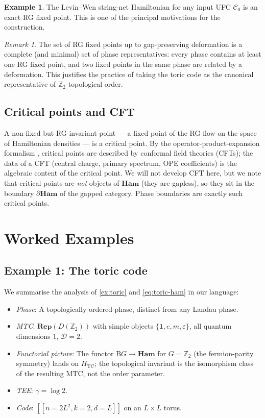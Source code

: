 \documentclass[12pt]{article}
\theoremstyle{plain}
\theoremstyle{definition}
\newtheorem{example}[theorem]{Example}
\theoremstyle{remark}
\newtheorem{remark}[theorem]{Remark}
\newcommand{\Ham}{\mathbf{Ham}}
\newcommand{\Rep}{\mathbf{Rep}}
\newcommand{\BG}{\mathrm{B}G}
\begin{document}
\begin{example}
The Levin--Wen string-net Hamiltonian for any input UFC $\mathcal{C}_{0}$ is an exact RG
fixed point. This is one of the principal motivations for the construction.
\end{example}

\begin{remark}
The set of RG fixed points up to gap-preserving deformation is a complete (and minimal)
set of phase representatives: every phase contains at least one RG fixed point, and two
fixed points in the same phase are related by a deformation. This justifies the practice
of taking the toric code as the canonical representative of $\mathbb{Z}_{2}$ topological
order.
\end{remark}

\subsection{Critical points and CFT}

A non-fixed but RG-invariant point --- a fixed point of the RG flow on the space of
Hamiltonian densities --- is a critical point. By the operator-product-expansion formalism
\cite{Wilson1983}, critical points are described by conformal field theories (CFTs); the
data of a CFT (central charge, primary spectrum, OPE coefficients) is the algebraic
content of the critical point. We will not develop CFT here, but we note that critical
points are \emph{not} objects of $\Ham$ (they are gapless), so they sit in the
boundary $\partial\Ham$ of the gapped category. Phase boundaries are exactly such
critical points.

\section{Worked Examples}
\label{sec:examples}

\subsection{Example 1: The toric code}

We summarise the analysis of \cref{ex:toric} and \cref{eq:toric-ham} in our language:
\begin{itemize}
  \item \emph{Phase}: A topologically ordered phase, distinct from any Landau phase.
  \item \emph{MTC}: $\Rep(D(\mathbb{Z}_{2}))$ with simple objects
    $\{\mathbf{1},e,m,\varepsilon\}$, all quantum dimensions $1$, $\mathcal{D}=2$.
  \item \emph{Functorial picture}: The functor $\BG\to\Ham$ for $G=\mathbb{Z}_{2}$ (the
    fermion-parity symmetry) lands on $H_{\mathrm{TC}}$; the topological invariant is the
    isomorphism class of the resulting MTC, not the order parameter.
  \item \emph{TEE}: $\gamma=\log 2$.
  \item \emph{Code}: $[[n=2L^{2},k=2,d=L]]$ on an $L\times L$ torus.
\end{itemize}
\end{document}

